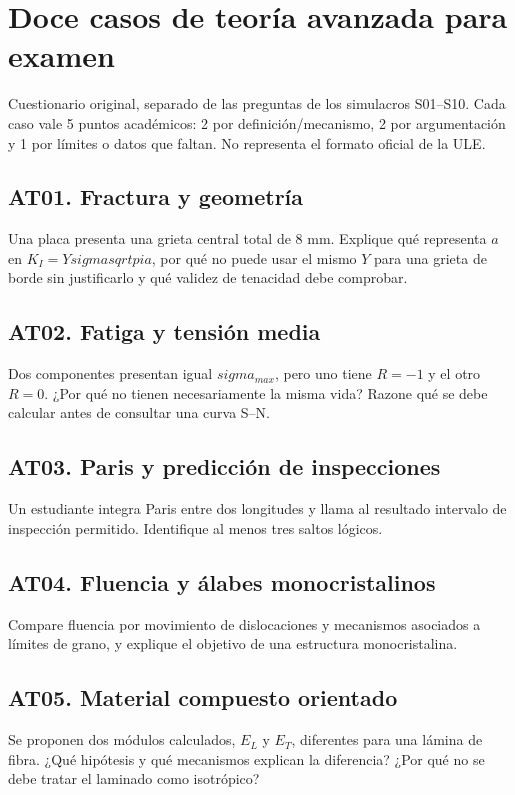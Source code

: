 \chapter{Doce casos de teoría avanzada para examen}
\label{ch:matmo-teoria-avanzada}
\noindent Cuestionario original, separado de las preguntas de los simulacros S01--S10. Cada caso vale 5 puntos académicos: 2 por definición/mecanismo, 2 por argumentación y 1 por límites o datos que faltan. No representa el formato oficial de la ULE.

\section*{AT01. Fractura y geometría}
Una placa presenta una grieta central total de 8 mm. Explique qué representa $a$ en $K_I=Ysigmasqrt{pi a}$, por qué no puede usar el mismo $Y$ para una grieta de borde sin justificarlo y qué validez de tenacidad debe comprobar.

\section*{AT02. Fatiga y tensión media}
Dos componentes presentan igual $sigma_{max}$, pero uno tiene $R=-1$ y el otro $R=0$. ¿Por qué no tienen necesariamente la misma vida? Razone qué se debe calcular antes de consultar una curva S--N.

\section*{AT03. Paris y predicción de inspecciones}
Un estudiante integra Paris entre dos longitudes y llama al resultado intervalo de inspección permitido. Identifique al menos tres saltos lógicos.

\section*{AT04. Fluencia y álabes monocristalinos}
Compare fluencia por movimiento de dislocaciones y mecanismos asociados a límites de grano, y explique el objetivo de una estructura monocristalina.

\section*{AT05. Material compuesto orientado}
Se proponen dos módulos calculados, $E_L$ y $E_T$, diferentes para una lámina de fibra. ¿Qué hipótesis y qué mecanismos explican la diferencia? ¿Por qué no se debe tratar el laminado como isotrópico?

